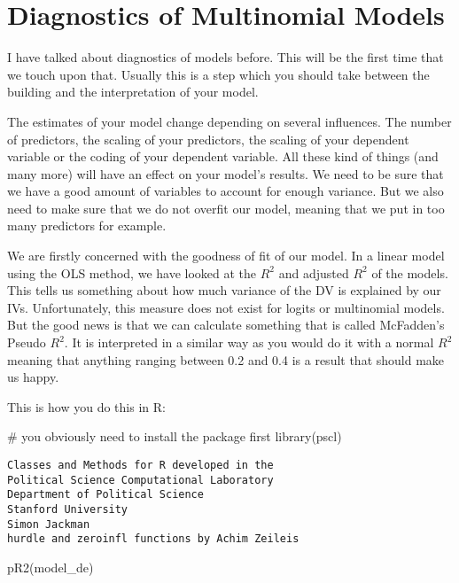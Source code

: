 \documentclass[
  letterpaper,
  DIV=11,
  numbers=noendperiod]{scrreprt}
\newenvironment{Shaded}{\begin{snugshade}}{\end{snugshade}}
\newcommand{\CommentTok}[1]{\textcolor[rgb]{0.37,0.37,0.37}{#1}}
\newcommand{\FunctionTok}[1]{\textcolor[rgb]{0.28,0.35,0.67}{#1}}
\newcommand{\NormalTok}[1]{\textcolor[rgb]{0.00,0.23,0.31}{#1}}
\begin{document}
\hypertarget{diagnostics-of-multinomial-models}{%
\chapter{Diagnostics of Multinomial
Models}\label{diagnostics-of-multinomial-models}}

I have talked about diagnostics of models before. This will be the first
time that we touch upon that. Usually this is a step which you should
take between the building and the interpretation of your model.

The estimates of your model change depending on several influences. The
number of predictors, the scaling of your predictors, the scaling of
your dependent variable or the coding of your dependent variable. All
these kind of things (and many more) will have an effect on your model's
results. We need to be sure that we have a good amount of variables to
account for enough variance. But we also need to make sure that we do
not overfit our model, meaning that we put in too many predictors for
example.

We are firstly concerned with the goodness of fit of our model. In a
linear model using the OLS method, we have looked at the \(R^2\) and
adjusted \(R^2\) of the models. This tells us something about how much
variance of the DV is explained by our IVs. Unfortunately, this measure
does not exist for logits or multinomial models. But the good news is
that we can calculate something that is called McFadden's Pseudo
\(R^2\). It is interpreted in a similar way as you would do it with a
normal \(R^2\) meaning that anything ranging between 0.2 and 0.4 is a
result that should make us happy.

This is how you do this in R:

\begin{Shaded}
\begin{Highlighting}[]
\CommentTok{\# you obviously need to install the package first}
\FunctionTok{library}\NormalTok{(pscl)}
\end{Highlighting}
\end{Shaded}

\begin{verbatim}
Classes and Methods for R developed in the
Political Science Computational Laboratory
Department of Political Science
Stanford University
Simon Jackman
hurdle and zeroinfl functions by Achim Zeileis
\end{verbatim}

\begin{Shaded}
\begin{Highlighting}[]
\FunctionTok{pR2}\NormalTok{(model\_de)}
\end{Highlighting}
\end{Shaded}
\end{document}
